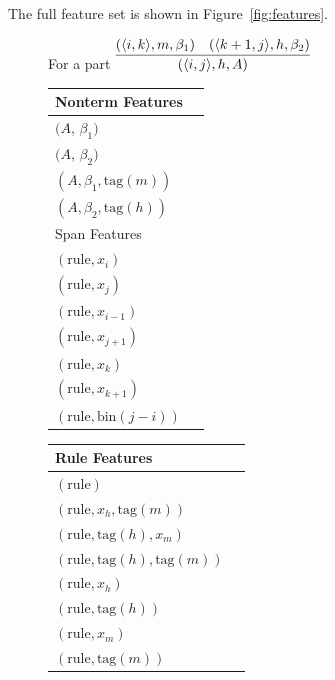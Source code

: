 \documentclass[11pt,letterpaper]{article}
\newcommand{\Span}[1]{\langle #1 \rangle}
\newcommand{\RuleSym}{\mathrm{rule}}
\newcommand{\BinFN}[1]{\mathrm{bin}({#1})}
\newcommand{\TagFN}[1]{\mathrm{tag}({#1})}
\newcommand{\WordFN}[1]{x_{#1}}
\begin{document}
The full feature set  is shown in Figure~\ref{fig:features}.



\begin{figure}
  \footnotesize
  \centering
  For a part $ \infer{(\Span{i, j}, h, A)}{(\Span{i, k}, m, \beta_1) &  (\Span{k+1, j}, h, \beta_2)} $

  \vspace{0.5cm}

  \begin{multicols}{2}

  \begin{tabular}{|l|l}

  \hline
  Nonterm Features \\
  \hline

  \hline
  $(A$, $\beta_1)$ \\
  $(A$, $\beta_2)$ \\
  $(A, \beta_1, \TagFN{m})$ \\
  $(A, \beta_2, \TagFN{h})$ \\
  \hline
    \hline
  Span Features \\
  \hline

  \hline
  $(\RuleSym, \WordFN{i})$\\
  $(\RuleSym, \WordFN{j})$\\
  $(\RuleSym, \WordFN{i-1})$\\
  $(\RuleSym, \WordFN{j+1})$\\
  $(\RuleSym, \WordFN{k})$\\
  $(\RuleSym, \WordFN{k+1})$\\
  $(\RuleSym, \BinFN{j-i})$\\
  \hline

  \end{tabular}

  \begin{tabular}{|l|l}

  \hline


  Rule Features \\
  \hline

  \hline

  $(\RuleSym  )$\\
  $(\RuleSym, \WordFN{h}, \TagFN{m})$ \\
  $(\RuleSym, \TagFN{h}, \WordFN{m})$ \\
  $(\RuleSym, \TagFN{h}, \TagFN{m})$ \\

  $(\RuleSym, \WordFN{h})$ \\
  $(\RuleSym, \TagFN{h})$ \\
  $(\RuleSym, \WordFN{m})$ \\
  $(\RuleSym, \TagFN{m})$ \\


\end{tabular}
\end{multicols}
\end{figure}
\end{document}
